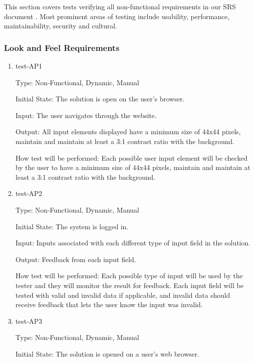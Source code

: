 \documentclass[12pt, titlepage]{article}
\begin{document}
This section covers tests verifying all non-functional requirements in our SRS
document \cite{SRS}. Most prominent areas of testing include usability,
performance, maintainability, security and cultural.

\subsubsection{Look and Feel Requirements}

\begin{enumerate}

  \item{test-AP1\\}

  Type: Non-Functional, Dynamic, Manual

  Initial State: The solution is open on the user's browser.

  Input: The user navigates through the website. 

  Output: All input elements displayed have a minimum size of 44x44 pixels, 
  maintain and maintain at least a 3:1 contrast ratio with the background.

  How test will be performed: Each possible user input element will be checked by 
  the user to have a minimum size of 44x44 pixels, maintain and maintain at 
  least a 3:1 contrast ratio with the background.

  \item{test-AP2\\}

  Type: Non-Functional, Dynamic, Manual

  Initial State: The system is logged in.

  Input: Inputs associated with each different type of input field in the
  solution.

  Output: Feedback from each input field.

  How test will be performed: Each possible type of input will be used by the
  tester and they will monitor the result for feedback. Each input field will
  be tested with valid and invalid data if applicable, and invalid data should
  receive feedback that lets the user know the input was invalid.

\item{test-AP3\\}

Type: Non-Functional, Dynamic, Manual

Initial State: The solution is opened on a user's web browser.


\end{enumerate}
\end{document}
